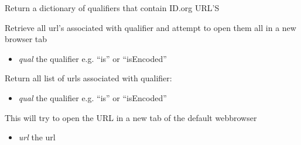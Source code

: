 \documentclass[a4paper,11pt,english]{sphinxmanual}
\begin{document}
\begin{fulllineitems}
\begin{fulllineitems}
\begin{itemize}
\end{itemize}

\end{fulllineitems}


\begin{fulllineitems}
\label{modules_doc:cbmpy.CBDataStruct.MIRIAMannotation.getAllMIRIAMUris}
Return a dictionary of qualifiers that contain ID.org URL'S

\end{fulllineitems}


\begin{fulllineitems}
\label{modules_doc:cbmpy.CBDataStruct.MIRIAMannotation.getAndViewUrisForQualifier}
Retrieve all url's associated with qualifier and attempt to open them all in a new browser tab
\begin{itemize}
\item {} 
\emph{qual} the qualifier e.g. ``is'' or ``isEncoded''

\end{itemize}

\end{fulllineitems}


\begin{fulllineitems}
\label{modules_doc:cbmpy.CBDataStruct.MIRIAMannotation.getMIRIAMUrisForQualifier}
Return all list of urls associated with qualifier:
\begin{itemize}
\item {} 
\emph{qual} the qualifier e.g. ``is'' or ``isEncoded''

\end{itemize}

\end{fulllineitems}


\begin{fulllineitems}
\label{modules_doc:cbmpy.CBDataStruct.MIRIAMannotation.viewURL}
This will try to open the URL in a new tab of the default webbrowser
\begin{itemize}
\item {} 
\emph{url} the url

\end{itemize}

\end{fulllineitems}


\end{fulllineitems}
\end{document}

